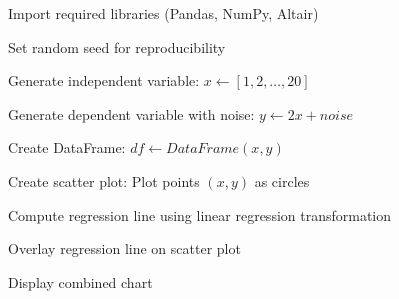 \begin{algorithm}
\caption{Scatter Plot with Regression Line using Altair}
\begin{algorithmic}[1]

\STATE Import required libraries (Pandas, NumPy, Altair)

\STATE Set random seed for reproducibility

\STATE Generate independent variable:
\STATE $x \gets [1, 2, \dots, 20]$

\STATE Generate dependent variable with noise:
\STATE $y \gets 2x + noise$

\STATE Create DataFrame:
\STATE $df \gets DataFrame(x, y)$

\STATE Create scatter plot:
\STATE Plot points $(x, y)$ as circles

\STATE Compute regression line using linear regression transformation

\STATE Overlay regression line on scatter plot

\STATE Display combined chart

\end{algorithmic}
\end{algorithm}